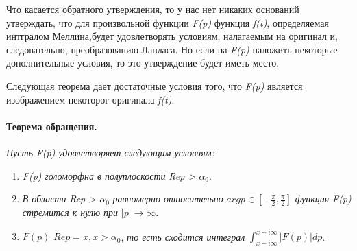 \documentclass[a4paper, 12pt]{report}
\begin{document}
Что касается обратного утверждения, то у нас нет никаких оснований утверждать, что для произвольной функции \textsl{F(p)} функция \textsl{f(t)}, определяемая интгралом Меллина,будет удовлетворять условиям, налагаемым на оригинал и, следовательно, преобразованию Лапласа. Но если на \textsl{F(p)} наложить некоторые дополнительные условия, то это утверждение будет иметь место.

Следующая теорема дает достаточные условия того, что \textsl{F(p)} является изображением некоторог оригинала \textsl{f(t)}.

\paragraph{Теорема обращения.}
\textit{Пусть} \textsl{F(p)} \textit{удовлетворяет следующим условиям:}
\begin{enumerate}
    \item \textsl{F(p)} \textit{голоморфна в полуплоскости} \textsl{Rep > {$\alpha_0$}}.

    \item \textit{В области} \textsl{Rep > {$\alpha_0$}}\textit{ равномерно относительно} {$arg p \in [-\displaystyle\frac{\pi}{2} , \displaystyle\frac{\pi}{2}]$}\textit{ функция} \textsl{F(p)} 
    \textit{стремится к нулю при} $|p| \longrightarrow\infty$.

    \item $F(p)$ \textit{} $Rep=x, x > \alpha_0$, \textit{то есть сходится интеграл} $\int_{x-i\infty}^{x+i\infty}|F(p)|dp$.
\end{enumerate}
\end{document}

